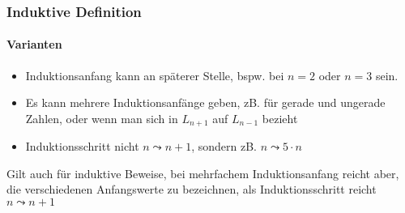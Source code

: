 \documentclass{beamer}
\begin{document}
	\begin{frame}
		\frametitle{Induktive Definition}
		\framesubtitle{Varianten}
		\begin{itemize}
			\item Induktionsanfang kann an späterer Stelle, bspw. bei $n=2$ oder $n=3$ sein.
			\item Es kann mehrere Induktionsanfänge geben, zB. für gerade und ungerade Zahlen, oder wenn man sich in $L_{n+1}$ auf $L_{n-1}$ bezieht
			\item Induktionsschritt nicht $n\leadsto n+1$, sondern zB. $n\leadsto 5\cdot n$
		\end{itemize}
		Gilt auch für induktive Beweise, bei mehrfachem Induktionsanfang reicht aber, die verschiedenen Anfangswerte zu bezeichnen, als Induktionsschritt reicht $n\leadsto n+1$
	\end{frame}
\end{document}
